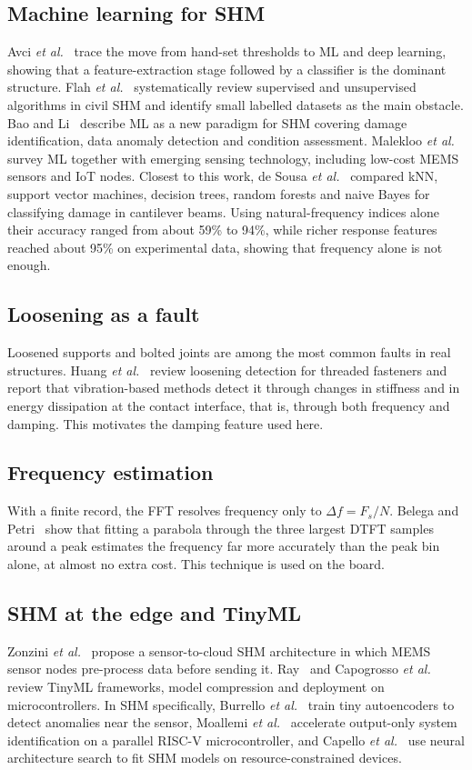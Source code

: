 \documentclass[conference]{IEEEtran}
\begin{document}
\subsection{Machine learning for SHM}
Avci \emph{et al.}~\cite{avci2021} trace the move from hand-set thresholds to ML and deep learning, showing that a feature-extraction stage followed by a classifier is the dominant structure. Flah \emph{et al.}~\cite{flah2021} systematically review supervised and unsupervised algorithms in civil SHM and identify small labelled datasets as the main obstacle. Bao and Li~\cite{bao2021} describe ML as a new paradigm for SHM covering damage identification, data anomaly detection and condition assessment. Malekloo \emph{et al.}~\cite{malekloo2022} survey ML together with emerging sensing technology, including low-cost MEMS sensors and IoT nodes. Closest to this work, de Sousa \emph{et al.}~\cite{desousa2023} compared kNN, support vector machines, decision trees, random forests and naive Bayes for classifying damage in cantilever beams. Using natural-frequency indices alone their accuracy ranged from about 59\% to 94\%, while richer response features reached about 95\% on experimental data, showing that frequency alone is not enough.

\subsection{Loosening as a fault}
Loosened supports and bolted joints are among the most common faults in real structures. Huang \emph{et al.}~\cite{huang2022} review loosening detection for threaded fasteners and report that vibration-based methods detect it through changes in stiffness and in energy dissipation at the contact interface, that is, through both frequency and damping. This motivates the damping feature used here.

\subsection{Frequency estimation}
With a finite record, the FFT resolves frequency only to $\Delta f = F_s/N$. Belega and Petri~\cite{belega2021} show that fitting a parabola through the three largest DTFT samples around a peak estimates the frequency far more accurately than the peak bin alone, at almost no extra cost. This technique is used on the board.

\subsection{SHM at the edge and TinyML}
Zonzini \emph{et al.}~\cite{zonzini2020} propose a sensor-to-cloud SHM architecture in which MEMS sensor nodes pre-process data before sending it. Ray~\cite{ray2022} and Capogrosso \emph{et al.}~\cite{capogrosso2024} review TinyML frameworks, model compression and deployment on microcontrollers. In SHM specifically, Burrello \emph{et al.}~\cite{burrello2022} train tiny autoencoders to detect anomalies near the sensor, Moallemi \emph{et al.}~\cite{moallemi2023} accelerate output-only system identification on a parallel RISC-V microcontroller, and Capello \emph{et al.}~\cite{capello2025} use neural architecture search to fit SHM models on resource-constrained devices.
\end{document}
